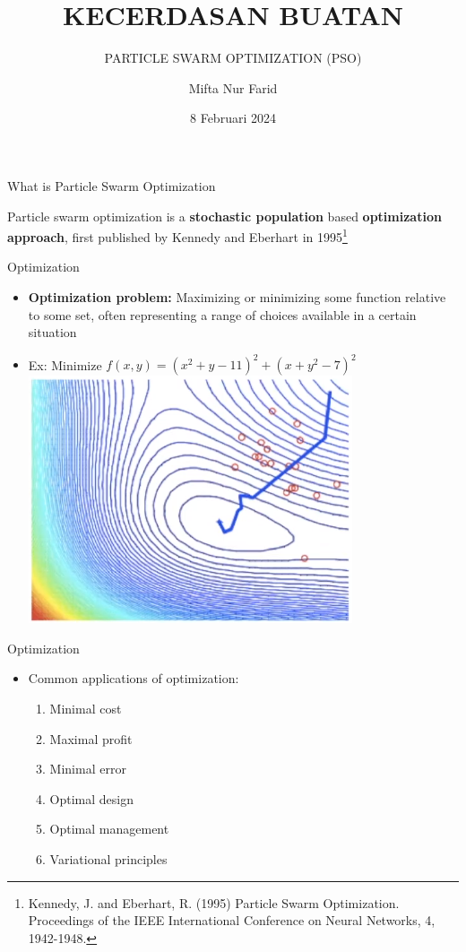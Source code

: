 \documentclass[pdflatex,compress,mathserif]{beamer}
\title{KECERDASAN BUATAN}
\subtitle{PARTICLE SWARM OPTIMIZATION (PSO)}
\author{Mifta Nur Farid}
\date{8 Februari 2024}
\begin{document}
\maketitle

\begin{frame}{What is Particle Swarm Optimization}
	\begin{definition}
		Particle swarm optimization is a \textbf{stochastic population} based \textbf{optimization approach}, first published by Kennedy and Eberhart in 1995\footnote{Kennedy, J. and Eberhart, R. (1995) Particle Swarm Optimization. Proceedings of the IEEE International Conference on Neural Networks, 4, 1942-1948.}
	\end{definition}
\end{frame}

\begin{frame}{Optimization}
	\begin{itemize}
		\item \textbf{Optimization problem:} Maximizing or minimizing some function relative to some set, often representing a range of choices available in a certain situation
		\item Ex: Minimize $f(x,y) = (x^2 + y - 11)^2 + (x+y^2-7)^2$
		\centering\includegraphics[width=0.6\linewidth]{img/01}
	\end{itemize}
\end{frame}

\begin{frame}{Optimization}
	\begin{itemize}
		\item Common applications of optimization:
		\begin{enumerate}
			\item Minimal cost
			\item Maximal profit
			\item Minimal error
			\item Optimal design
			\item Optimal management
			\item Variational principles
		\end{enumerate}
	\end{itemize}
\end{frame}
\end{document}
